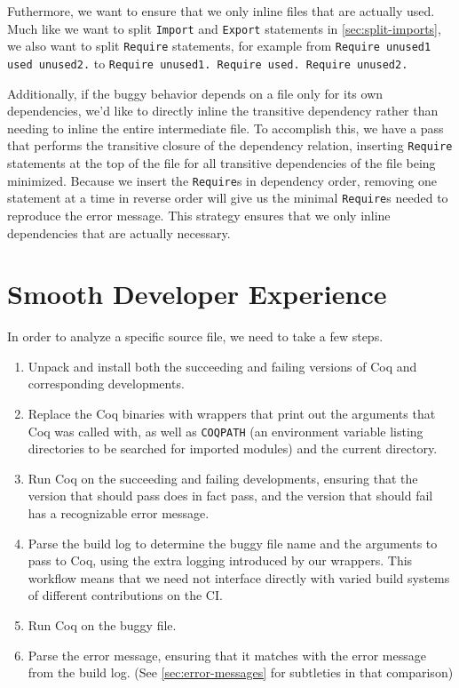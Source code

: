 \documentclass[a4paper,USenglish,cleveref,autoref,thm-restate]{lipics-v2021}
\begin{document}
Futhermore, we want to ensure that we only inline files that are actually used.
Much like we want to split \texttt{Import} and \verb|Export| statements in \autoref{sec:split-imports}, we also want to split \verb|Require| statements, for example from \texttt{Require unused1 used unused2.} to \texttt{Require unused1. Require used. Require unused2.}

Additionally, if the buggy behavior depends on a file only for its own dependencies, we'd like to directly inline the transitive dependency rather than needing to inline the entire intermediate file.
To accomplish this, we have a pass that performs the transitive closure of the dependency relation, inserting \verb|Require| statements at the top of the file for all transitive dependencies of the file being minimized.
Because we insert the \verb|Require|s in dependency order, removing one statement at a time in reverse order will give us the minimal \verb|Require|s needed to reproduce the error message.
This strategy ensures that we only inline dependencies that are actually necessary.

\section{Smooth Developer Experience}

In order to analyze a specific source file, we need to take a few steps.
\begin{enumerate}
\item Unpack and install both the succeeding and failing versions of Coq and corresponding developments.
\item Replace the Coq binaries with wrappers that print out the arguments that Coq was called with, as well as \texttt{COQPATH} (an environment variable listing directories to be searched for imported modules) and the current directory.
\item Run Coq on the succeeding and failing developments, ensuring that the version that should pass does in fact pass, and the version that should fail has a recognizable error message.
\item Parse the build log to determine the buggy file name and the arguments to pass to Coq, using the extra logging introduced by our wrappers.
  This workflow means that we need not interface directly with varied build systems of different contributions on the CI.
\item Run Coq on the buggy file.
\item Parse the error message, ensuring that it matches with the error message from the build log.
  (See \autoref{sec:error-messages} for subtleties in that comparison)
\end{enumerate}
\end{document}
